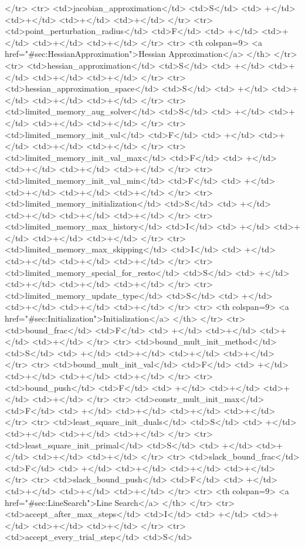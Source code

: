 {{</tr>
<tr>
<td>jacobian_approximation</td>
<td>S</td>
<td> +</td>
<td>+</td>
<td>+</td>
<td>+</td>
</tr>
<tr>
<td>point_perturbation_radius</td>
<td>F</td>
<td> +</td>
<td>+</td>
<td>+</td>
<td>+</td>
</tr>
<tr>   <th colspan=9> <a href="#sec:HessianApproximation">Hessian Approximation</a> </th>
</tr>
<tr>
<td>hessian_approximation</td>
<td>S</td>
<td> +</td>
<td>+</td>
<td>+</td>
<td>+</td>
</tr>
<tr>
<td>hessian_approximation_space</td>
<td>S</td>
<td> +</td>
<td>+</td>
<td>+</td>
<td>+</td>
</tr>
<tr>
<td>limited_memory_aug_solver</td>
<td>S</td>
<td> +</td>
<td>+</td>
<td>+</td>
<td>+</td>
</tr>
<tr>
<td>limited_memory_init_val</td>
<td>F</td>
<td> +</td>
<td>+</td>
<td>+</td>
<td>+</td>
</tr>
<tr>
<td>limited_memory_init_val_max</td>
<td>F</td>
<td> +</td>
<td>+</td>
<td>+</td>
<td>+</td>
</tr>
<tr>
<td>limited_memory_init_val_min</td>
<td>F</td>
<td> +</td>
<td>+</td>
<td>+</td>
<td>+</td>
</tr>
<tr>
<td>limited_memory_initialization</td>
<td>S</td>
<td> +</td>
<td>+</td>
<td>+</td>
<td>+</td>
</tr>
<tr>
<td>limited_memory_max_history</td>
<td>I</td>
<td> +</td>
<td>+</td>
<td>+</td>
<td>+</td>
</tr>
<tr>
<td>limited_memory_max_skipping</td>
<td>I</td>
<td> +</td>
<td>+</td>
<td>+</td>
<td>+</td>
</tr>
<tr>
<td>limited_memory_special_for_resto</td>
<td>S</td>
<td> +</td>
<td>+</td>
<td>+</td>
<td>+</td>
</tr>
<tr>
<td>limited_memory_update_type</td>
<td>S</td>
<td> +</td>
<td>+</td>
<td>+</td>
<td>+</td>
</tr>
<tr>   <th colspan=9> <a href="#sec:Initialization">Initialization</a> </th>
</tr>
<tr>
<td>bound_frac</td>
<td>F</td>
<td> +</td>
<td>+</td>
<td>+</td>
<td>+</td>
</tr>
<tr>
<td>bound_mult_init_method</td>
<td>S</td>
<td> +</td>
<td>+</td>
<td>+</td>
<td>+</td>
</tr>
<tr>
<td>bound_mult_init_val</td>
<td>F</td>
<td> +</td>
<td>+</td>
<td>+</td>
<td>+</td>
</tr>
<tr>
<td>bound_push</td>
<td>F</td>
<td> +</td>
<td>+</td>
<td>+</td>
<td>+</td>
</tr>
<tr>
<td>constr_mult_init_max</td>
<td>F</td>
<td> +</td>
<td>+</td>
<td>+</td>
<td>+</td>
</tr>
<tr>
<td>least_square_init_duals</td>
<td>S</td>
<td> +</td>
<td>+</td>
<td>+</td>
<td>+</td>
</tr>
<tr>
<td>least_square_init_primal</td>
<td>S</td>
<td> +</td>
<td>+</td>
<td>+</td>
<td>+</td>
</tr>
<tr>
<td>slack_bound_frac</td>
<td>F</td>
<td> +</td>
<td>+</td>
<td>+</td>
<td>+</td>
</tr>
<tr>
<td>slack_bound_push</td>
<td>F</td>
<td> +</td>
<td>+</td>
<td>+</td>
<td>+</td>
</tr>
<tr>   <th colspan=9> <a href="#sec:LineSearch">Line Search</a> </th>
</tr>
<tr>
<td>accept_after_max_steps</td>
<td>I</td>
<td> +</td>
<td>+</td>
<td>+</td>
<td>+</td>
</tr>
<tr>
<td>accept_every_trial_step</td>
<td>S</td>
}}

